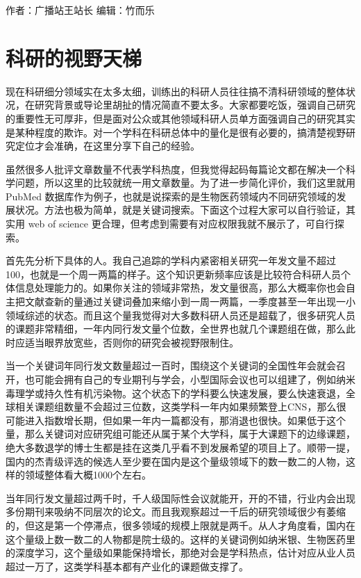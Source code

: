 \documentclass[]{book}
\begin{document}
作者：广播站王站长
编辑：竹而乐

\hypertarget{ux79d1ux7814ux7684ux89c6ux91ceux5929ux68af}{%
\section{科研的视野天梯}\label{ux79d1ux7814ux7684ux89c6ux91ceux5929ux68af}}

现在科研细分领域实在太多太细，训练出的科研人员往往搞不清科研领域的整体状况，在研究背景或导论里胡扯的情况简直不要太多。大家都要吃饭，强调自己研究的重要性无可厚非，但是面对公众或其他领域科研人员单方面强调自己的研究其实是某种程度的欺诈。对一个学科在科研总体中的量化是很有必要的，搞清楚视野研究定位才会准确，在这里分享下自己的经验。

虽然很多人批评文章数量不代表学科热度，但我觉得起码每篇论文都在解决一个科学问题，所以这里的比较就统一用文章数量。为了进一步简化评价，我们这里就用 PubMed 数据库作为例子，也就是说探索的是生物医药领域内不同研究领域的发展状况。方法也极为简单，就是关键词搜索。下面这个过程大家可以自行验证，其实用 web of science 更合理，但考虑到需要有对应权限我就不展示了，可自行探索。

首先先分析下具体的人。我自己追踪的学科内紧密相关研究一年发文量不超过100，也就是一个周一两篇的样子。这个知识更新频率应该是比较符合科研人员个体信息处理能力的。如果你关注的领域非常热，发文量很高，那么大概率你也会自主把文献查新的量通过关键词叠加来缩小到一周一两篇，一季度甚至一年出现一小领域综述的状态。而且这个量我觉得对大多数科研人员还是超载了，很多研究人员的课题非常精细，一年内同行发文量个位数，全世界也就几个课题组在做，那么此时应适当眼界放宽些，否则你的研究会被视野限制住。

当一个关键词年同行发文数量超过一百时，围绕这个关键词的全国性年会就会召开，也可能会拥有自己的专业期刊与学会，小型国际会议也可以组建了，例如纳米毒理学或持久性有机污染物。这个状态下的学科要么快速发展，要么快速衰退，全球相关课题组数量不会超过三位数，这类学科一年内如果频繁登上CNS，那么很可能进入指数增长期，但如果一年内一篇都没有，那消退也很快。如果低于这个量，那么关键词对应研究组可能还从属于某个大学科，属于大课题下的边缘课题，绝大多数退学的博士生都是挂在这类几乎看不到发展希望的项目上了。顺带一提，国内的杰青级评选的候选人至少要在国内是这个量级领域下的数一数二的人物，这样的领域整体看大概1000个左右。

当年同行发文量超过两千时，千人级国际性会议就能开，开的不错，行业内会出现多份期刊来吸纳不同层次的论文。而且我观察超过一千后的研究领域很少有萎缩的，但这是第一个停滞点，很多领域的规模上限就是两千。从人才角度看，国内在这个量级上数一数二的人物都是院士级的。这样的关键词例如纳米银、生物医药里的深度学习，这个量级如果能保持增长，那绝对会是学科热点，估计对应从业人员超过一万了，这类学科基本都有产业化的课题做支撑了。
\end{document}
